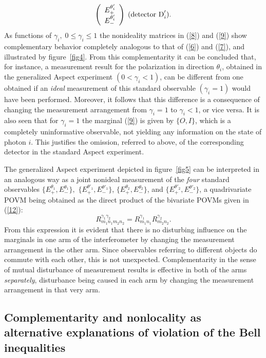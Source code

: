 \documentclass[12pt]{article}
\begin{document}
{\begin{equation}
\left( \begin{array}{c} {E}^{\theta'_i}_{+} \\ {E}^{\theta'_i}_{-}
\end{array} \right)\;\mbox{\rm (detector D}'_i).\end{equation}
As functions of $\gamma_i,\; 0\leq \gamma_i \leq 1$ the
nonideality matrices in (\ref{8}) and (\ref{9}) show complementary
behavior completely analogous to that of (\ref{6}) and (\ref{7}),
and illustrated by figure~\ref{fig4}. From this complementarity it
can be concluded that, for instance, a measurement result for the
polarization in direction $\theta_i$, obtained in the generalized
Aspect experiment $(0<\gamma_i<1)$, can be different from one
obtained if an \textit{ideal} measurement of this standard
observable $(\gamma_i =1)$ would have been performed. Moreover, it
follows that this difference is a consequence of changing the
measurement arrangement from $\gamma_i=1$ to $\gamma_i <1$, or
vice versa. It is also seen that for $\gamma_i=1$ the marginal
(\ref{9}) is given by $\{O,I\}$, which is a completely
uninformative observable, not yielding any information on the
state of photon $i$. This justifies the omission, referred to
above, of the corresponding detector in the standard Aspect
experiment.

The generalized Aspect experiment depicted in figure~\ref{fig5}
can be interpreted in an analogous way as a joint nonideal
measurement of the \textit{four} standard observables
$\{{E}^{\theta_1}_+,{E}^{\theta_1}_-\},$
$\{{E}^{\theta'_1}_+,{E}^{\theta'_1}_-\}$,
$\{{E}^{\theta_2}_+,{E}^{\theta_2}_-\}$, and
$\{{E}^{\theta'_2}_+,{E}^{\theta'_2}_-\}$, a quadrivariate POVM
being obtained as the direct product of the bivariate POVMs given
in (\ref{12}):
\begin{equation}\label{3.1}{R}^{\gamma_1\gamma_2}_{m_{\!1}n_{\!1}m_2 n_2} =
R^{\gamma_1}_{m_{\!1} n_{\!1}}
 R^{\gamma_2}_{m_2 n_2}.
\end{equation}
From this expression it is evident that there is no disturbing
influence on the marginals in one arm of the interferometer by
changing the measurement arrangement in the other arm. Since
observables referring to different objects do commute with each
other, this is not unexpected. Complementarity in the sense of
mutual disturbance of measurement results is effective in both of
the arms \textit{separately}, disturbance being caused in each arm
by changing the measurement arrangement in that very arm.


\subsection{Complementarity and nonlocality as alternative explanations
of violation of the Bell inequalities}\label{sec3.2}

}
\end{document}
